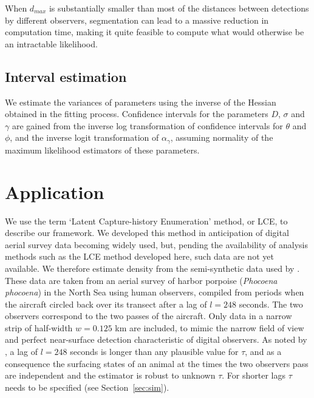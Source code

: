 \documentclass[useAMS, usenatbib, referee]{biom}\usepackage[]{graphicx}\usepackage[]{color}
\begin{document}
When $d_{max}$ is substantially smaller than most of the distances between detections by different observers, segmentation can lead to a massive reduction in computation time, making it quite feasible to compute what would otherwise be an intractable likelihood.



\subsection{Interval estimation}
\label{sec:ci}

We estimate the variances of parameters using the inverse of the Hessian obtained in the fitting process. Confidence intervals for the parameters $D$, $\sigma$ and $\gamma$ are gained from the inverse log transformation of confidence intervals for $\theta$ and $\phi$, and the inverse logit transformation of $\alpha_\gamma$, assuming normality of the maximum likelihood estimators of these parameters.


\section{Application \label{sec:applic}}

We use the term `Latent Capture-history Enumeration' method, or LCE, to describe our framework. We  developed this method in anticipation of digital aerial survey data becoming widely used, but, pending the availability of analysis methods such as the LCE method developed here, such data are not yet available. We therefore estimate density from the semi-synthetic data used by \cite{Stevenson+al:19}. These data are taken from an aerial survey of harbor porpoise ({\em Phocoena phocoena}) in the North Sea using human observers, compiled from periods when the aircraft circled back over its transect after a lag of $l=248$ seconds.
The two observers correspond to the two passes of the aircraft. Only data in a narrow strip of half-width $w=0.125$ km are included, to mimic the narrow field of view and perfect near-surface detection characteristic of digital observers. As noted by \cite{Stevenson+al:19}, a lag of $l=248$ seconds is longer than any plausible value for $\tau$, and as a consequence the surfacing states of an animal at the times the two observers pass are independent and the estimator is robust to unknown $\tau$. For shorter lags $\tau$ needs to be specified (see Section~\ref{sec:sim}).
\end{document}
